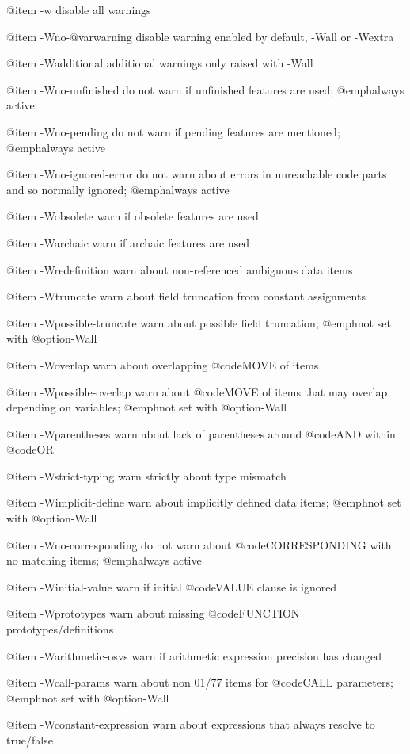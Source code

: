 @item -w
disable all warnings

@item -Wno-@var{warning}
disable warning enabled by default, -Wall or -Wextra

@item -Wadditional
additional warnings only raised with -Wall

@item -Wno-unfinished
do not warn if unfinished features are used; @emph{always} active

@item -Wno-pending
do not warn if pending features are mentioned; @emph{always} active

@item -Wno-ignored-error
do not warn about errors in unreachable code parts and so normally ignored; @emph{always} active

@item -Wobsolete
warn if obsolete features are used

@item -Warchaic
warn if archaic features are used

@item -Wredefinition
warn about non-referenced ambiguous data items

@item -Wtruncate
warn about field truncation from constant assignments

@item -Wpossible-truncate
warn about possible field truncation; @emph{not} set with @option{-Wall}

@item -Woverlap
warn about overlapping @code{MOVE} of items

@item -Wpossible-overlap
warn about @code{MOVE} of items that may overlap depending on variables; @emph{not} set with @option{-Wall}

@item -Wparentheses
warn about lack of parentheses around @code{AND} within @code{OR}

@item -Wstrict-typing
warn strictly about type mismatch

@item -Wimplicit-define
warn about implicitly defined data items; @emph{not} set with @option{-Wall}

@item -Wno-corresponding
do not warn about @code{CORRESPONDING} with no matching items; @emph{always} active

@item -Winitial-value
warn if initial @code{VALUE} clause is ignored

@item -Wprototypes
warn about missing @code{FUNCTION} prototypes/definitions

@item -Warithmetic-osvs
warn if arithmetic expression precision has changed

@item -Wcall-params
warn about non 01/77 items for @code{CALL} parameters; @emph{not} set with @option{-Wall}

@item -Wconstant-expression
warn about expressions that always resolve to true/false

